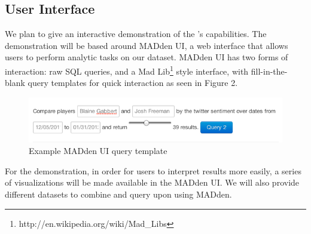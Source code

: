 \subsection{User Interface}

We plan to give an interactive demonstration of the 
{\system}'s capabilities. The demonstration will be based around MADden UI,
a web interface that allows users to perform analytic tasks on our dataset.
MADden UI has two forms of interaction: raw SQL queries, and a Mad
Lib\footnote{http://en.wikipedia.org/wiki/Mad\_Libs} style interface, with
fill-in-the-blank query templates for quick interaction as seen in Figure
2.

\begin{figure}
\begin{center}
	\includegraphics[scale=.43]{content/graphics/example_madlib.png}
\end{center}
\caption{Example MADden UI query template} 
\label{fig:madlib}
\end{figure}

For the demonstration, in order for users to interpret results more 
easily, a series of
visualizations will be made available in the MADden UI. We will also provide
different datasets to combine and query upon using MADden.


